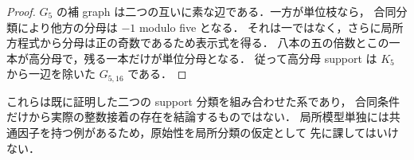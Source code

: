 \begin{proof}
$G_5$ の補 graph は二つの互いに素な辺である．一方が単位枝なら，
合同分類により他方の分母は $-1$ modulo five となる．
それは一ではなく，さらに局所方程式から分母は正の奇数であるため表示式を得る．
八本の五の倍数とこの一本が高分母で，残る一本だけが単位分母となる．
従って高分母 support は $K_5$ から一辺を除いた $G_{5,16}$ である．
\end{proof}

これらは既に証明した二つの support 分類を組み合わせた系であり，
合同条件だけから実際の整数接着の存在を結論するものではない．
局所模型単独には共通因子を持つ例があるため，原始性を局所分類の仮定として
先に課してはいけない．
